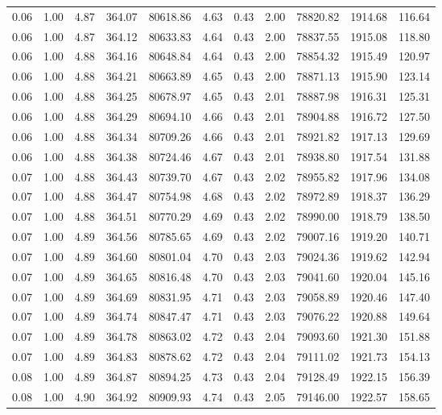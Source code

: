 \begin{table}[!ht]
\begin{tabular}{rrrrrrrrrrr}
0.06 & 1.00 & 4.87 & 364.07 & 80618.86 & 4.63 & 0.43 & 2.00 & 78820.82 & 1914.68 & 116.64 \\
0.06 & 1.00 & 4.87 & 364.12 & 80633.83 & 4.64 & 0.43 & 2.00 & 78837.55 & 1915.08 & 118.80 \\
0.06 & 1.00 & 4.88 & 364.16 & 80648.84 & 4.64 & 0.43 & 2.00 & 78854.32 & 1915.49 & 120.97 \\
0.06 & 1.00 & 4.88 & 364.21 & 80663.89 & 4.65 & 0.43 & 2.00 & 78871.13 & 1915.90 & 123.14 \\
0.06 & 1.00 & 4.88 & 364.25 & 80678.97 & 4.65 & 0.43 & 2.01 & 78887.98 & 1916.31 & 125.31 \\
0.06 & 1.00 & 4.88 & 364.29 & 80694.10 & 4.66 & 0.43 & 2.01 & 78904.88 & 1916.72 & 127.50 \\
0.06 & 1.00 & 4.88 & 364.34 & 80709.26 & 4.66 & 0.43 & 2.01 & 78921.82 & 1917.13 & 129.69 \\
0.06 & 1.00 & 4.88 & 364.38 & 80724.46 & 4.67 & 0.43 & 2.01 & 78938.80 & 1917.54 & 131.88 \\
0.07 & 1.00 & 4.88 & 364.43 & 80739.70 & 4.67 & 0.43 & 2.02 & 78955.82 & 1917.96 & 134.08 \\
0.07 & 1.00 & 4.88 & 364.47 & 80754.98 & 4.68 & 0.43 & 2.02 & 78972.89 & 1918.37 & 136.29 \\
0.07 & 1.00 & 4.88 & 364.51 & 80770.29 & 4.69 & 0.43 & 2.02 & 78990.00 & 1918.79 & 138.50 \\
0.07 & 1.00 & 4.89 & 364.56 & 80785.65 & 4.69 & 0.43 & 2.02 & 79007.16 & 1919.20 & 140.71 \\
0.07 & 1.00 & 4.89 & 364.60 & 80801.04 & 4.70 & 0.43 & 2.03 & 79024.36 & 1919.62 & 142.94 \\
0.07 & 1.00 & 4.89 & 364.65 & 80816.48 & 4.70 & 0.43 & 2.03 & 79041.60 & 1920.04 & 145.16 \\
0.07 & 1.00 & 4.89 & 364.69 & 80831.95 & 4.71 & 0.43 & 2.03 & 79058.89 & 1920.46 & 147.40 \\
0.07 & 1.00 & 4.89 & 364.74 & 80847.47 & 4.71 & 0.43 & 2.03 & 79076.22 & 1920.88 & 149.64 \\
0.07 & 1.00 & 4.89 & 364.78 & 80863.02 & 4.72 & 0.43 & 2.04 & 79093.60 & 1921.30 & 151.88 \\
0.07 & 1.00 & 4.89 & 364.83 & 80878.62 & 4.72 & 0.43 & 2.04 & 79111.02 & 1921.73 & 154.13 \\
0.08 & 1.00 & 4.89 & 364.87 & 80894.25 & 4.73 & 0.43 & 2.04 & 79128.49 & 1922.15 & 156.39 \\
0.08 & 1.00 & 4.90 & 364.92 & 80909.93 & 4.74 & 0.43 & 2.05 & 79146.00 & 1922.57 & 158.65 \\

\end{tabular}
\end{table}
